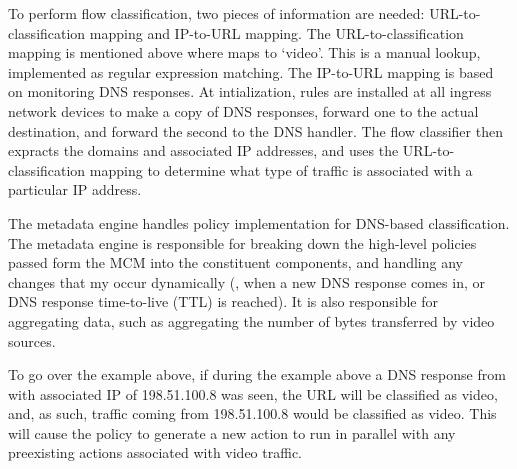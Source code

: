 To perform flow classification, two pieces of information are needed: URL-to-classification mapping and IP-to-URL mapping. The URL-to-classification mapping is mentioned above where  maps to `video'. This is a manual lookup, implemented as regular expression matching. The IP-to-URL mapping is based on monitoring DNS responses. At intialization, rules are installed at all ingress network devices to make a copy of DNS responses, forward one to the actual destination, and forward the second to the DNS handler. The flow classifier then expracts the domains and associated IP addresses, and uses the URL-to-classification mapping to determine what type of traffic is associated with a particular IP address. 


The metadata engine handles policy implementation for DNS-based classification. The metadata engine is responsible for breaking down the high-level policies passed form the MCM into the constituent components, and handling any changes that my occur dynamically (\ie{}, when a new DNS response comes in, or DNS response time-to-live (TTL) is reached). It is also responsible for aggregating data, such as aggregating the number of bytes transferred by video sources.

To go over the example above, if during the example above a DNS response from  with associated IP of 198.51.100.8 was seen, the URL will be classified as video, and, as such, traffic coming from 198.51.100.8 would be classified as video. This will cause the  policy to generate a new  action to run in parallel with any preexisting actions associated with video traffic. 

